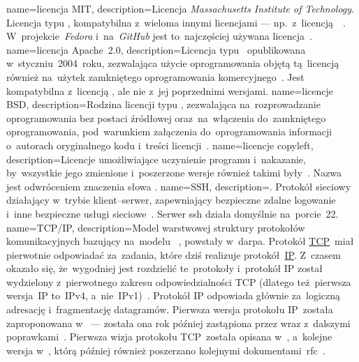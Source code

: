 {
	name={licencja MIT},
	description={Licencja \emph{Massachusetts Institute of Technology}. Licencja typu , kompatybilna z~wieloma innymi  licencjami --- np.~z~licencją~~\cite{mit}. W~projekcie~\emph{Fedora} i~na~\emph{GitHub} jest to~najczęściej używana licencja~\cite{mit-popularity-fedora,mit-popularity-github}.}
}
{
	name={licencja Apache~2.0},
	description={Licencja typu ~opublikowana w~styczniu~2004~roku, zezwalająca użycie oprogramowania objętą tą~licencją również na~użytek zamkniętego oprogramowania komercyjnego~\cite{apache2.0}. Jest kompatybilna z~licencją , ale nie z~jej poprzednimi wersjami.}
}
{
	name={licencje BSD},
	description={Rodzina licencji typu , zezwalająca na~rozprowadzanie oprogramowania bez postaci źródłowej oraz~na~włączenia do~zamkniętego oprogramowania, pod~warunkiem załączenia do~oprogramowania informacji o~autorach oryginalnego kodu i~treści licencji~\cite{bsd}.}
}
{
	name={licencje copyleft},
	description={Licencje umożliwiające uczynienie programu  i~nakazanie, by~wszystkie jego zmienione i~poszerzone wersje również takimi były~\cite{copyleft}. Nazwa  jest odwróceniem znaczenia słowa .}
}
{
	name={SSH},
	description={. Protokół sieciowy działający w~trybie klient--serwer, zapewniający bezpieczne zdalne logowanie i~inne bezpieczne usługi sieciowe~\cite{rfc:ssh}. Serwer \gls{ssh} działa domyślnie na~porcie~22.}
}
{
	name={TCP/IP},
	description={Model warstwowej struktury protokołów komunikacyjnych bazujący na~modelu ~\cite{rfc:tcpip-dod}, powstały w~\gls{darpa}. Protokół \href{https://en.wikipedia.org/wiki/Transmission_Control_Protocol}{TCP}~miał pierwotnie odpowiadać za~zadania, które dziś realizuje protokół~\href{https://en.wikipedia.org/wiki/Internet_Protocol}{IP}. Z~czasem okazało się, że~wygodniej jest rozdzielić te~protokoły i~protokół IP został wydzielony z~pierwotnego zakresu odpowiedzialności TCP (dlatego też~pierwsza wersja~IP to~IPv4, a~nie~IPv1)~\cite{tcpguide-tcpip-history}. Protokół IP odpowiada głównie za~logiczną adresację i~fragmentację datagramów. Pierwsza wersja protokołu IP~została zaproponowana w~ --- została ona rok później zastąpiona przez  wraz z~dalszymi poprawkami~\cite{rfc:ip-rfc760,rfc:ip-rfc791}. Pierwsza wizja protokołu TCP~została opisana w~, a~kolejne wersja w~, którą później również poszerzano kolejnymi dokumentami~\gls{rfc}~\cite{rfc:tcp-rfc675,rfc:ip-rfc793}.}
}
